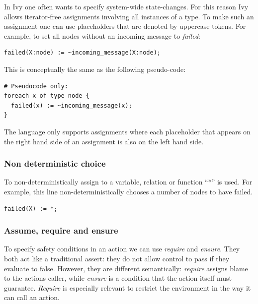 \documentclass[fleqn]{article}
\begin{document}
In Ivy one often wants to specify system-wide state-changes. For this reason Ivy allows iterator-free assignments involving all instances of a type. To make such an assignment one can use placeholders that are denoted by uppercase tokens. For example, to set all nodes without an incoming message to \textit{failed}:

\begin{mdframed}[nobreak=true, backgroundcolor=light-gray, roundcorner=10pt,leftmargin=1, rightmargin=1, innerleftmargin=15, innertopmargin=15,innerbottommargin=15, outerlinewidth=1, linecolor=light-gray]
\begin{lstlisting}
failed(X:node) := ~incoming_message(X:node);
\end{lstlisting}
\end{mdframed}

\noindent This is conceptually the same as the following pseudo-code:

\begin{mdframed}[nobreak=true, backgroundcolor=light-gray, roundcorner=10pt,leftmargin=1, rightmargin=1, innerleftmargin=15, innertopmargin=15,innerbottommargin=15, outerlinewidth=1, linecolor=light-gray]
\begin{lstlisting}
# Pseudocode only:
foreach x of type node {
  failed(x) := ~incoming_message(x);
}
\end{lstlisting}
\end{mdframed}

The language only supports assignments where each placeholder that appears on the right hand side of an assignment is also on the left hand side.


\subsubsection{Non deterministic choice}
To non-deterministically assign to a variable, relation or function ``*'' is used.
For example, this line non-deterministically chooses a number of nodes to have failed.

\begin{mdframed}[nobreak=true, backgroundcolor=light-gray, roundcorner=10pt,leftmargin=1, rightmargin=1, innerleftmargin=15, innertopmargin=15,innerbottommargin=15, outerlinewidth=1, linecolor=light-gray]
\begin{lstlisting}
failed(X) := *;
\end{lstlisting}
\end{mdframed}

\subsubsection{Assume, require and ensure}
To specify safety conditions in an action we can use \textit{require} and \textit{ensure}.
They both act like a traditional assert: they do not allow control to pass if they evaluate to false.
However, they are different semantically: \textit{require} assigns blame to the actions caller, while \textit{ensure}
is a condition that the action itself must guarantee. \textit{Require} is especially relevant to restrict
the environment in the way it can call an action.
\end{document}
